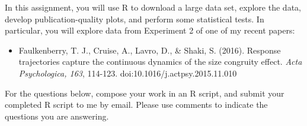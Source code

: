 \documentclass[10pt]{article}
\begin{document}
\noindent
In this assignment, you will use R to download a large data set, explore the data, develop publication-quality plots, and perform some statistical tests.  In particular, you will explore data from Experiment 2 of one of my recent papers:

\begin{itemize}
\item Faulkenberry, T. J., Cruise, A., Lavro, D., \& Shaki, S. (2016). Response trajectories capture the continuous dynamics of the size congruity effect. {\it Acta Psychologica, 163}, 114-123. doi:10.1016/j.actpsy.2015.11.010
\end{itemize}

\noindent
For the questions below, compose your work in an R script, and submit your completed R script to me by email.  Please use comments to indicate the questions you are answering.
\end{document}
